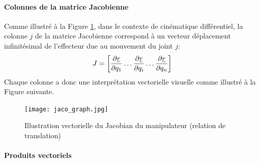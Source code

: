 \paragraph{Colonnes de la matrice Jacobienne} Comme illustré à la Figure \ref{fig:jaco_graph}, dans le contexte de cinématique différentiel, la colonne $j$ de la matrice Jacobienne correspond à un vecteur déplacement infinitésimal de l'effecteur due au mouvement du joint $j$:
\begin{equation}
J = \left[ \frac{\partial \underline{r}}{\partial q_1}   \hdots \frac{\partial \underline{r}}{\partial q_i} \hdots \frac{\partial \underline{r}}{\partial q_n}  \right]
\end{equation}
Chaque colonne a donc une interprétation vectorielle visuelle comme illustré à la Figure suivante.
\begin{figure}[H]
\vspace{-5pt}
	\centering
		\texttt{[image: jaco\_graph.jpg]}
	\caption{Illustration vectorielle du Jacobian du manipulateur (relation de translation)}
	\vspace{-5pt}
	\label{fig:jaco_graph}
\end{figure}



\paragraph{Produits vectoriels}

